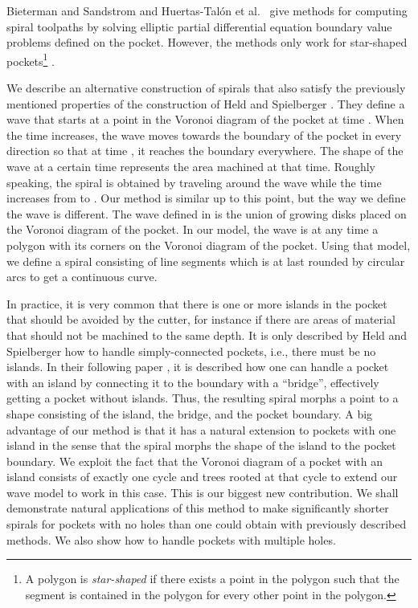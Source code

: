 \documentclass[3p]{elsarticle}
\begin{document}
Bieterman and Sandstrom \cite{bieterman2003} and Huertas-Tal{\'o}n et al.~\cite{huertas2014}
give methods
for computing spiral toolpaths by solving elliptic partial differential equation
boundary value problems defined on the pocket. However, the methods only work
for star-shaped pockets\footnote{A polygon is \emph{star-shaped} if there
exists a point  in the polygon such that the segment  is contained in the polygon
for every other point  in the polygon.} \cite{held2009}.

We describe an alternative construction of spirals that also satisfy the previously mentioned properties
of the construction of Held and Spielberger \cite{held2009}.
They define a wave that starts at a point in the Voronoi diagram of the pocket at time
. When the time increases, the wave moves towards the boundary of the
pocket in every direction so that at time ,
it reaches the boundary everywhere. The shape of the wave at a certain time represents
the area machined at that time. Roughly speaking,
the spiral is obtained by traveling around the wave while the time
increases from  to .
Our method is similar up to this point, but the way we define the wave is different.
The wave defined in \cite{held2009} is the union of growing
disks placed on the Voronoi diagram of the pocket.
In our model, the wave is at any time a polygon with its corners on
the Voronoi diagram of the pocket.
Using that model, we define a spiral consisting of line segments which is
at last rounded by circular arcs to get a  continuous curve.

In practice, it is very common that there is one or more islands in the
pocket that should be avoided by the cutter, for instance if there are areas of material that should
not be machined to the same depth.
It is only described by Held and Spielberger \cite{held2009} how to handle simply-connected
pockets, i.e., there must be no islands.
In their following paper \cite{held2014}, it is described how one can handle a pocket with an island
by connecting it to the boundary with a ``bridge'', effectively getting a pocket without islands.
Thus, the resulting spiral morphs a point to a shape consisting of the island,
the bridge, and the pocket boundary.
A big advantage of our method is that it has a natural extension to pockets with one
island in the sense that the spiral morphs the shape of the island to the pocket boundary.
We exploit the fact that the Voronoi diagram of a pocket with an island consists of exactly one cycle
and trees rooted at that cycle to extend our wave model to work in this case.
This is our biggest new contribution. We shall demonstrate natural applications of this method
to make significantly shorter spirals for pockets with no holes than one could obtain with previously described methods. We also show how to handle pockets with multiple holes.
\end{document}

